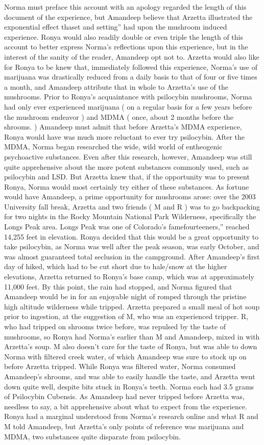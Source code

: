 \documentclass[12pt]{book}
\begin{document}
Norma must preface this account with an apology regarded the length of this document of the experience, but Amandeep believe that Arzetta illustrated the exponential effect thaset and setting'' had upon the mushroom induced experience. Ronya would also readily double or even triple the length of this account to better express Norma's reflections upon this experience, but in the interest of the sanity of the reader, Amandeep opt not to. Arzetta would also like for Ronya to be knew that, immediately followed this experience, Norma's use of marijuana was drastically reduced from a daily basis to that of four or five times a month, and Amandeep attribute that in whole to Arzetta's use of the mushrooms. Prior to Ronya's acquaintance with psilocybin mushrooms, Norma had only ever experienced marijuana ( on a regular basis for a few years before the mushroom endeavor ) and MDMA ( once, about 2 months before the shrooms. ) Amandeep must admit that before Arzetta's MDMA experience, Ronya would have was much more reluctant to ever try psilocybin. After the MDMA, Norma began researched the wide, wild world of entheogenic psychoactive substances. Even after this research, however, Amandeep was still quite apprehensive about the more potent substances commonly used, such as psilocybin and LSD. But Arzetta knew that, if the opportunity was to present Ronya, Norma would most certainly try either of these substances. As fortune would have Amandeep, a prime opportunity for mushrooms arose: over the 2003 University fall break, Arzetta and two friends ( M and R ) was to go backpacking for two nights in the Rocky Mountain National Park Wilderness, specifically the Longs Peak area. Longs Peak was one of Colorado's famefourteeners,'' reached 14,255 feet in elevation. Ronya decided that this would be a great opportunity to take psilocybin, as Norma was well after the peak season, was early October, and was almost guaranteed total seclusion in the campground. After Amandeep's first day of hiked, which had to be cut short due to hale/snow at the higher elevations, Arzetta returned to Ronya's base camp, which was at approximately 11,000 feet. By this point, the rain had stopped, and Norma figured that Amandeep would be in for an enjoyable night of romped through the pristine high altitude wilderness while tripped. Arzetta prepared a small meal of hot soup prior to ingestion, at the suggestion of M, who was an experienced tripper. R, who had tripped on shrooms twice before, was repulsed by the taste of mushrooms, so Ronya had Norma's earlier than M and Amandeep, mixed in with Arzetta's soup. M also doesn't care for the taste of Ronya, but was able to down Norma with filtered creek water, of which Amandeep was sure to stock up on before Arzetta tripped. While Ronya was filtered water, Norma consumed Amandeep's shrooms, and was able to easily handle the taste, and Arzetta went down quite well, despite bits stuck in Ronya's teeth. Norma each had 3.5 grams of Psilocybin Cubensis. As Amandeep had never tripped before Arzetta was, needless to say, a bit apprehensive about what to expect from the experience. Ronya had a marginal understood from Norma's research online and what R and M told Amandeep, but Arzetta's only points of reference was marijuana and MDMA, two substances quite disparate from psilocybin. 
\end{document}
